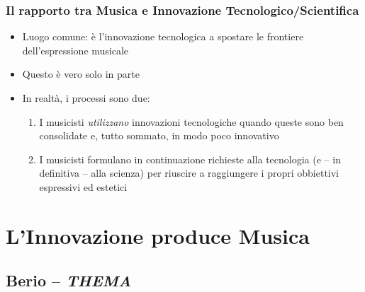\documentclass[compress]{beamer}
\begin{document}
\begin{frame}
    \frametitle<+- | alert@+->{Il rapporto tra Musica e Innovazione Tecnologico/Scientifica}

    \begin{itemize}[<+- | alert@+->]
        \item Luogo comune: \`e l'innovazione tecnologica a spostare le
            frontiere dell'espressione musicale
        \item Questo \`e vero solo in parte
        \item In realt\`a, i processi sono due:
            \begin{enumerate}[<+- | alert@+->]
                \item I musicisti \emph{utilizzano} innovazioni tecnologiche
                    quando queste sono ben consolidate e, tutto sommato, in
                    modo poco innovativo
                \item I musicisti formulano in continuazione richieste alla
                    tecnologia (e -- in definitiva -- alla scienza) per
                    riuscire a raggiungere i propri obbiettivi espressivi ed
                    estetici
            \end{enumerate}
    \end{itemize}

\end{frame}

\section[Innovazione $\Rightarrow$ Musica]{L'Innovazione produce Musica}

\subsection{Berio -- {\it THEMA}}
\end{document}
